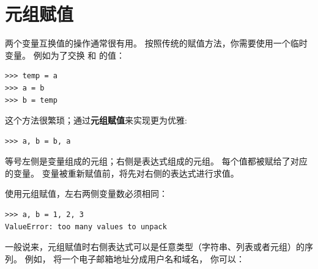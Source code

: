 \section{元组赋值}
\label{tuple.assignment}  
 


两个变量互换值的操作通常很有用。 
按照传统的赋值方法，你需要使用一个临时变量。 
例如为了交换 和  的值：

\begin{lstlisting}
>>> temp = a
>>> a = b
>>> b = temp
\end{lstlisting}
%

这个方法很繁琐；通过{\bf 元组赋值}来实现更为优雅:

\begin{lstlisting}
>>> a, b = b, a
\end{lstlisting}
%

等号左侧是变量组成的元组；右侧是表达式组成的元组。
每个值都被赋给了对应的变量。
变量被重新赋值前，将先对右侧的表达式进行求值。


使用元组赋值，左右两侧变量数必须相同：

  

\begin{lstlisting}
>>> a, b = 1, 2, 3
ValueError: too many values to unpack
\end{lstlisting}
%

一般说来，元组赋值时右侧表达式可以是任意类型（字符串、列表或者元组）的序列。 例如， 将一个电子邮箱地址分成用户名和域名， 你可以：


